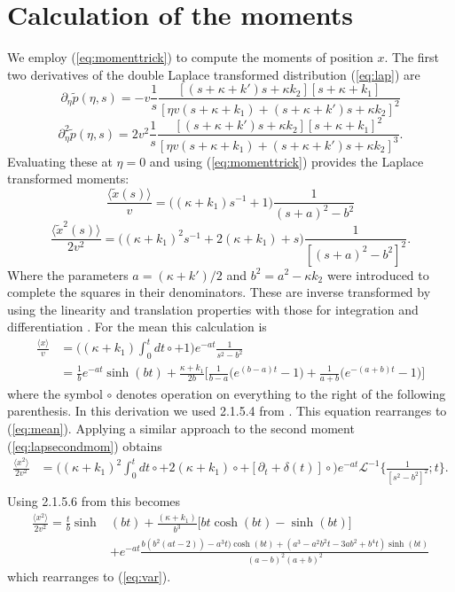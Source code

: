 \documentclass[]{agujournal2018}
\newcommand\be{\begin{equation}}
\newcommand\ee{\end{equation}}
\newcommand\bra{\langle}
\newcommand\ket{\rangle}
\newcommand\tp{\tilde{p}}
\newcommand\El{\mathcal{L}}
\begin{document}
\section{Calculation of the moments}
\label{sec:appendixB}
We employ (\ref{eq:momenttrick}) to compute the moments of position $x$. The first two derivatives of the double Laplace transformed distribution (\ref{eq:lap}) are
\be \partial_\eta \tp(\eta,s) = -v \frac{1}{s}\frac{[(s+\kappa + k')s + \kappa k_2][s+\kappa + k_1]}{[\eta v(s+\kappa +k_1) + (s+ \kappa + k')s+\kappa k_2]^2}\ee
\be \partial_\eta^2 \tp(\eta,s) = 2v^2 \frac{1}{s} \frac{[(s+\kappa + k')s+\kappa k_2][s+\kappa + k_1]^2}{[\eta v(s+\kappa + k_1) + (s+\kappa + k')s+ \kappa k_2]^3}.\ee
Evaluating these at $\eta=0$ and using (\ref{eq:momenttrick}) provides the Laplace transformed moments:
\be  \frac{\bra\tilde{x}(s)\ket} {v} = \Big((\kappa+k_1)s^{-1}+1 \Big)\frac{1}{(s+a)^2-b^2} \label{eq:lapmean}\ee
\be \frac{\bra \tilde{x}^2(s) \ket}{2v^2} = \Big((\kappa+k_1)^2s^{-1} + 2(\kappa+k_1) + s\Big) \frac{1}{[(s+a)^2-b^2]^2}.\label{eq:lapsecondmom}\ee
Where the parameters $a= (\kappa+k')/2$ and $b^2 = a^2 -\kappa k_2$ were introduced to complete the squares in their denominators.
These are inverse transformed by using the linearity and translation properties with those for integration and differentiation \citep[e.g.][]{Arfken1985}.
For the mean this calculation is
\begin{align}
\frac{\bra x \ket}{v} &= \Big((\kappa+k_1)\int_0^t dt \circ+1 \Big)e^{-at}\frac{1}{s^2-b^2}\\
&=  \frac{1}{b}e^{-at}\sinh(bt) + \frac{\kappa + k_1}{2b}\Big[\frac{1}{b-a}\Big(e^{(b-a)t}-1\Big)+ \frac{1}{a+b}\Big(e^{-(a+b)t}-1\Big)\Big]
\end{align}
where the symbol $\circ$ denotes operation on everything to the right of the following parenthesis. In this derivation we used 2.1.5.4 from \citet{Prudnikov1992a}. This equation rearranges to (\ref{eq:mean}).
Applying a similar approach to the second moment (\ref{eq:lapsecondmom}) obtains
\begin{align}
\frac{\bra x^2 \ket}{2v^2} 
&= \Big((\kappa+k_1)^2\int_0^t dt \circ + 2(\kappa + k_1)\circ +  [\partial_t + \delta(t)]\circ \Big)e^{-at}\El^{-1}\Big\{\frac{1}{[s^2-b^2]^2};t\Big\}.\\
\end{align}
Using 2.1.5.6 from \citet{Prudnikov1992a} this becomes
\begin{align}
\frac{\bra x^2 \ket}{2v^2} = \frac{t}{b}\sinh&(bt) + \frac{(\kappa + k_1)}{b^3}\big[bt\cosh(bt)-\sinh(bt)\big]\\
&+e^{-at}\frac{b(b^2(at-2))-a^3t)\cosh(bt) +(a^3-a^2b^2t-3ab^2+b^4t)\sinh(bt)}{(a-b)^2(a+b)^2}
\end{align}
which rearranges to (\ref{eq:var}).
\end{document}
